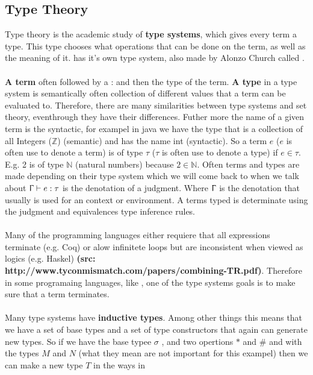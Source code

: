 \subsection{Type Theory}
\label{Type Theory}
Type theory is the academic study of \textbf{type systems}, 
which gives every term a type. This type chooses what operations 
that can be done on the term, as well as the meaning of it. 
 has it's own type system, also made 
by Alonzo Church called .
\\ \\
\textbf{A term} often followed by a : and then the type of the term.
\textbf{A type} in a type system is semantically often collection of different
values that a term can be evaluated to. Therefore, there are many 
similarities between type systems and set theory, eventhrough they 
have their differences. Futher more the name of a given term is the syntactic, 
for exampel in java we have the type that  is a collection of all Integers ($\mathbb{Z}$) (semantic) 
and has the name int (syntactic).
So a term $e$ ($e$ is often use to denote a term) is of type 
$\tau$ ($\tau$ is often use to denote a type) if $e \in \tau$. 
E.g. 2 is of type $\mathbb{N}$ (natural numbers) because 
$2 \in \mathbb{N}$. Often terms and types are made depending on their 
type system which we will come back to when we talk about 
$\Upgamma \vdash e:\tau$ is the denotation of a judgment. 
Where $\Upgamma$ is the denotation that usually is used for an 
context or environment. A terms typed is determinate using the 
judgment and equivalences type inference rules. 
\\ \\
Many of the programming languages either requiere that all expressions terminate (e.g. Coq) or alow 
infinitete loops but are inconsistent when viewed as logics (e.g. Haskel) \textbf{(src: http://www.tyconmismatch.com/papers/combining-TR.pdf)}.
Therefore in some programaing languages, like , one of the type systems goals 
is to make sure that a term terminates. 
\\ \\
Many type systems have \textbf{inductive types}. Among other things this means that we have a set of base types
and a set of type constructors that again can generate new types. So if we have the base typee $\sigma$ , 
and two opertions $*$ and $\#$ and with the types $M$ and $N$ (what they mean are not important for this exampel) 
then we can make a new type $T$ in the ways in 

